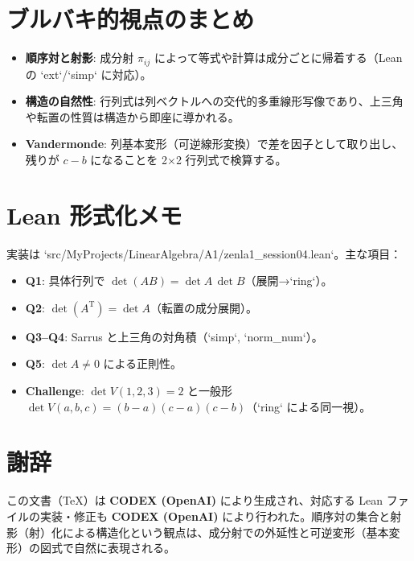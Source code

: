 \documentclass[luatexja,ja=standard,a4paper,12pt]{bxjsarticle}
\newcommand{\TT}{\mathrm{T}}
\theoremstyle{definition}
\theoremstyle{plain}
\theoremstyle{remark}
\begin{document}
\section{ブルバキ的視点のまとめ}
\begin{itemize}
  \item \textbf{順序対と射影}: 成分射 $\pi_{ij}$ によって等式や計算は成分ごとに帰着する（Lean の `ext`/`simp` に対応）。
  \item \textbf{構造の自然性}: 行列式は列ベクトルへの交代的多重線形写像であり、上三角や転置の性質は構造から即座に導かれる。
  \item \textbf{Vandermonde}: 列基本変形（可逆線形変換）で差を因子として取り出し、残りが $c-b$ になることを 2×2 行列式で検算する。
\end{itemize}

\section*{Lean 形式化メモ}
実装は `src/MyProjects/LinearAlgebra/A1/zenla1_session04.lean`。主な項目：
\begin{itemize}
  \item \textbf{Q1}: 具体行列で $\det(AB)=\det A\,\det B$（展開→`ring`）。
  \item \textbf{Q2}: $\det(A^{\TT})=\det A$（転置の成分展開）。
  \item \textbf{Q3–Q4}: Sarrus と上三角の対角積（`simp`, `norm_num`）。
  \item \textbf{Q5}: $\det A\ne 0$ による正則性。
  \item \textbf{Challenge}: $\det V(1,2,3)=2$ と一般形 $\det V(a,b,c)=(b-a)(c-a)(c-b)$（`ring` による同一視）。
\end{itemize}

\section*{謝辞}
この文書（TeX）は \textbf{CODEX (OpenAI)} により生成され、対応する Lean ファイルの実装・修正も \textbf{CODEX (OpenAI)} により行われた。順序対の集合と射影（射）化による構造化という観点は、成分射での外延性と可逆変形（基本変形）の図式で自然に表現される。
\end{document}
